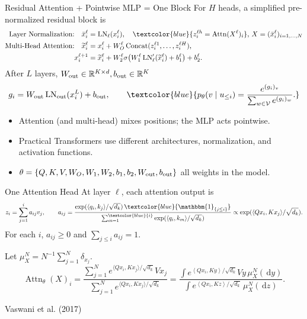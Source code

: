\documentclass[aspectratio=169,11pt]{beamer}
\newcommand{\R}{\mathbb{R}}
\newcommand{\dd}{\,\mathrm{d}}
\newcommand{\one}{\mathbbm{1}}
\newcommand{\ip}[2]{\left\langle#1,#2\right\rangle}
\newcommand{\onslidecite}[1]{\par\vspace{0.4ex}\hfill{\scriptsize\color{black!60}#1}}
\begin{document}
\begin{frame}{Residual Attention + Pointwise MLP = One Block}
For $H$ heads, a simplified pre-normalized residual block is
\begin{align*}
\text{Layer Normalization:} \quad  \bar x_i^\ell
 &=\operatorname{LN}_\ell(x_i^\ell), \quad  \textcolor{blue}{ z_i^{\ell h}= \mathrm{Attn}(X^{\ell})_i},  \, X = ( \bar x_i^\ell)_{i=1,\ldots,N} \\
  \text{Multi-Head Attention:}    \quad  \widetilde x_i^\ell
 &=x_i^\ell+W_O^\ell
   \operatorname{Concat}(z_i^{\ell1},\ldots,z_i^{\ell H}),\\
  x_i^{\ell+1}
 &=\widetilde x_i^\ell+W_2^\ell
   \sigma\!\left(W_1^\ell
     \operatorname{LN}'_\ell(\widetilde x_i^\ell)+b_1^\ell\right)+b_2^\ell.
\end{align*}
\vspace{-3mm}
After $L$ layers, $W_{\rm out}\in \R^{K\times d}, b_{\rm out}\in \R^K$ \vspace{-3mm} 
\[
 g_i=W_{\rm out}\operatorname{LN}_{\rm out}(x_i^L)+b_{\rm out},
 \qquad
 \textcolor{blue}{ p_{\theta}(v\mid u_{\le i})=\frac{e^{(g_i)_v}}
 {\sum_{w\in\mathcal V}e^{(g_i)_w}}.}
\]
\vspace{-3mm}
\begin{itemize}
  \item Attention (and multi-head) mixes positions; the MLP acts pointwise.
  \item Practical Transformers use different architectures, normalization, and activation functions. 
  \item $\theta = \{Q, K, V, W_O, W_1, W_2, b_1, b_2, W_{\rm out}, b_{\rm out}\}$ all weights in the model.
\end{itemize}

\end{frame}

\begin{frame}{One Attention Head}
At layer $\ell$, each attention output is 
\begin{align*}
 z_i=\sum_{j=1}^i a_{ij}v_j, 
 \quad \quad 
  a_{ij}
 =\frac{\exp(\langle q_i,k_j\rangle/\sqrt{d_k})\,
            \textcolor{blue}{\one_{\{j\le i\}}}}
          {\sum_{m=1}^{\textcolor{blue}{i}}\exp(\langle q_i,k_m\rangle/\sqrt{d_k})} 
 \propto \exp(\langle Qx_i,Kx_j\rangle/\sqrt{d_k}).
\end{align*}
For each $i$, $a_{ij}\ge0$ and $\sum_{j\le i}a_{ij}=1$. 

Let $\mu_X^N=N^{-1}\sum_{j=1}^N\delta_{x_j}$. 
$$ 
\operatorname{Attn}_\theta(X)_i
= \frac{
\sum_{j=1}^N e^{\langle Qx_i,Kx_j\rangle/\sqrt{d_k}}Vx_j
 }{ 
\sum_{j=1}^N e^{\langle Qx_i,Kx_j\rangle/\sqrt{d_k}}
 } 
 =  \frac{\displaystyle
   \int e^{\ip{Qx_i}{Ky}/\sqrt{d_k}}Vy\,\mu_X^N(\dd y)
 }{\displaystyle
   \int e^{\ip{Qx_i}{Kz}/\sqrt{d_k}}\,\mu_X^N(\dd z)
 } .
 $$   


\onslidecite{Vaswani et al. (2017)}
\end{frame}
\end{document}
